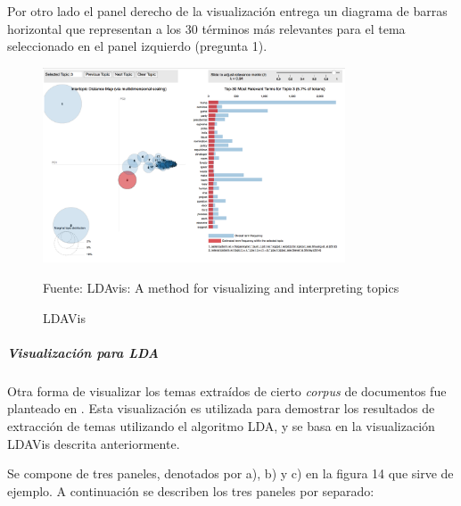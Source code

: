     Por otro lado el panel derecho de la visualización entrega un diagrama de barras horizontal que representan a los 30 términos más relevantes para el tema seleccionado en el panel izquierdo (pregunta 1).
    \begin{figure}[H]
        \centering
        \includegraphics[width=0.8\textwidth]{figures/LDAVis.png}
        \caption{\label{fig:LDAVis} LDAVis} Fuente: LDAvis: A method for visualizing and interpreting topics \cite{sievert2014ldavis}
    \end{figure}
\subparagraph{Visualización para LDA}
\subparagraph*{}
    Otra forma de visualizar los temas extraídos de cierto \textit{corpus} de documentos fue planteado en \cite{kucher2018analysis}. Esta visualización es utilizada para demostrar los resultados de extracción de temas utilizando el algoritmo LDA, y se basa en la visualización LDAVis descrita anteriormente. 
    
   Se compone de tres paneles, denotados por a), b) y c) en la figura 14 que sirve de ejemplo. A continuación se describen los tres paneles por separado:
    
